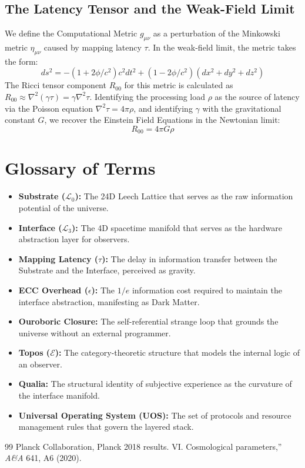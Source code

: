 \documentclass[11pt,titlepage]{article}
\newcommand{\substrate}{\mathcal{L}_0}
\newcommand{\interface}{\mathcal{L}_3}
\newcommand{\topos}{\mathcal{E}}
\begin{document}
\subsection{The Latency Tensor and the Weak-Field Limit}
We define the Computational Metric $g_{\mu\nu}$ as a perturbation of the Minkowski metric $\eta_{\mu\nu}$ caused by mapping latency $\tau$. In the weak-field limit, the metric takes the form:
\begin{equation}
ds^2 = -(1 + 2\phi/c^2)c^2 dt^2 + (1 - 2\phi/c^2)(dx^2 + dy^2 + dz^2)
\end{equation}
The Ricci tensor component $R_{00}$ for this metric is calculated as $R_{00} \approx \nabla^2 (\gamma \tau) = \gamma \nabla^2 \tau$. Identifying the processing load $\rho$ as the source of latency via the Poisson equation $\nabla^2 \tau = 4\pi \rho$, and identifying $\gamma$ with the gravitational constant $G$, we recover the Einstein Field Equations in the Newtonian limit:
\begin{equation}
R_{00} = 4\pi G \rho
\end{equation}


\section{Glossary of Terms}
\label{app:glossary}
\begin{itemize}
    \item \textbf{Substrate ($\substrate$):} The 24D Leech Lattice that serves as the raw information potential of the universe.
    \item \textbf{Interface ($\interface$):} The 4D spacetime manifold that serves as the hardware abstraction layer for observers.
    \item \textbf{Mapping Latency ($\tau$):} The delay in information transfer between the Substrate and the Interface, perceived as gravity.
    \item \textbf{ECC Overhead ($\epsilon$):} The $1/e$ information cost required to maintain the interface abstraction, manifesting as Dark Matter.
    \item \textbf{Ouroboric Closure:} The self-referential strange loop that grounds the universe without an external programmer.
    \item \textbf{Topos ($\topos$):} The category-theoretic structure that models the internal logic of an observer.
    \item \textbf{Qualia:} The structural identity of subjective experience as the curvature of the interface manifold.
    \item \textbf{Universal Operating System (UOS):} The set of protocols and resource management rules that govern the layered stack.
\end{itemize}


\begin{thebibliography}{99}
 Planck Collaboration, Planck 2018 results. VI. Cosmological parameters,'' \textit{A\&A} 641, A6 (2020).
\end{thebibliography}
\end{document}
